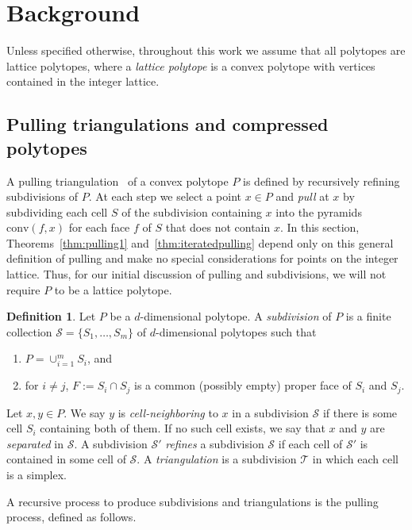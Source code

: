\documentclass[12pt]{amsart}
\theoremstyle{definition}
\newtheorem{definition}[theorem]{Definition}
\newcommand{\defn}[1]{\emph{\color{blue} #1}}
\newcommand\calS{\mathcal{S}}
\newcommand\calT{\mathcal{T}}
\newcommand\conv{\mathrm{conv}}
\begin{document}
\section{Background}\label{sec:background}

Unless specified otherwise, throughout this work we assume that all polytopes are lattice polytopes, where a \defn{lattice polytope} is a convex polytope with vertices contained in the integer lattice.

\subsection{Pulling triangulations and compressed polytopes}\label{sec:pulling-triangulations}

A pulling triangulation~\cite{triangulationshandbook} of a convex polytope $P$ is defined by recursively refining subdivisions of $P$.
At each step we select a point $x\in P$ and \defn{pull} at $x$ by subdividing each cell $S$ of the subdivision containing $x$ into the pyramids $\conv(f,x)$ for each face $f$ of $S$ that does not contain $x$.
In this section, Theorems~\ref{thm:pulling1} and~\ref{thm:iteratedpulling} depend only on this general definition of pulling and make no special considerations for points on the integer lattice.
Thus, for our initial discussion of pulling and subdivisions, we will not require $P$ to be a lattice polytope.

\begin{definition}
    Let $P$ be a $d$-dimensional polytope. A \defn{subdivision} of $P$ is a finite collection $\calS = \{S_1,\dots,S_m\}$ of $d$-dimensional polytopes such that
\begin{enumerate}
    \item $P = \cup_{i=1}^m S_i$, and
    \item for $i\neq j$, $F:=S_i \cap S_j$ is a common (possibly empty) proper face of $S_i$ and $S_j$.
\end{enumerate}     
    Let $x,y\in P$. 
    We say $y$ is \defn{cell-neighboring} to $x$ in a subdivision $\calS$ if there is some cell $S_i$ containing both of them.
    If no such cell exists, we say that $x$ and $y$ are \defn{separated} in $\calS$.
    A subdivision $\mathcal{S'}$ \defn{refines} a subdivision $\calS$ if each cell of $\calS'$ is contained in some cell of $\calS$.
    A \defn{triangulation} is a subdivision $\calT$ in which each cell is a simplex.
\end{definition}

A recursive process to produce subdivisions and triangulations is the pulling process, defined as follows.
\end{document}

